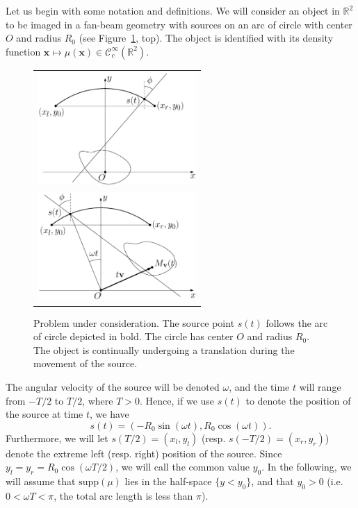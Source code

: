 \documentclass[twocolumn]{IEEEtran}
\newcommand{\R}{\mathbb{R}}
\newcommand{\ie}{i.e.}
\newcommand{\Ccinf}{\mathcal{C}_c^{\infty}}
\newcommand{\supp}{\textrm{supp}}
\begin{document}
Let us begin with some notation and definitions. We will consider an object in $\R^2$ to be imaged in a fan-beam geometry with sources on an arc of circle with center $O$ and radius $R_0$ (see Figure~\ref{fig:notations}, top). The object is identified with its density function $\mathbf{x} \mapsto \mu(\mathbf{x}) \in \Ccinf(\R^2)$.
\begin{figure}[!ht]
	\centering
	\begin{tabular}{c}
	\includegraphics[width=60mm]{figs/frame_scanner_still.eps} \\
	\includegraphics[width=60mm]{figs/frame_scanner.eps}
	\end{tabular}
	\caption{Problem under consideration. The source point $s(t)$ follows the arc of circle depicted in bold. The circle has center $O$ and radius $R_0$. The object is continually undergoing a translation during the movement of the source.\label{fig:notations}}
\end{figure}
The angular velocity of the source will be denoted $\omega$, and the time $t$ will range from $-T/2$ to $T/2$, where $T>0$. Hence, if we use $s(t)$ to denote the position of the source at time $t$, we have
\begin{equation}
	s(t) = \left( -R_0 \sin(\omega t), R_0 \cos(\omega t) \right).
\label{eq:source_position}
\end{equation}
Furthermore, we will let $s(T/2)=(x_l,y_l)$ (resp. $s(-T/2)=(x_r,y_r)$) denote the extreme left (resp. right) position of the source. Since $y_l = y_r = R_0 \cos(\omega T/2)$, we will call the common value $y_0$. In the following, we will assume that $\supp(\mu)$ lies in the half-space $\{ y < y_0 \}$, and that $y_0 > 0$ (\ie $0 < \omega T < \pi$, the total arc length is less than $\pi$).
\end{document}
